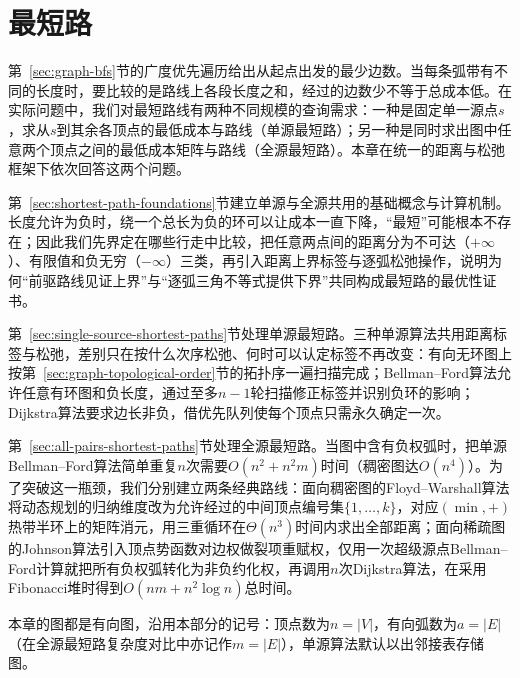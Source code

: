 
\chapter{最短路}
\label{sec:graph-shortest-paths}
\label{chap:shortest-paths}
\label{chap:all-pairs-shortest-paths}
\label{chap:graph-optimization}

第~\ref{sec:graph-bfs}节的广度优先遍历给出从起点出发的最少边数。当每条弧带有不同的长度时，要比较的是路线上各段长度之和，经过的边数少不等于总成本低。在实际问题中，我们对最短路线有两种不同规模的查询需求：一种是固定单一源点$s$，求从$s$到其余各顶点的最低成本与路线（单源最短路）；另一种是同时求出图中任意两个顶点之间的最低成本矩阵与路线（全源最短路）。本章在统一的距离与松弛框架下依次回答这两个问题。

第~\ref{sec:shortest-path-foundations}节建立单源与全源共用的基础概念与计算机制。长度允许为负时，绕一个总长为负的环可以让成本一直下降，“最短”可能根本不存在；因此我们先界定在哪些行走中比较，把任意两点间的距离分为不可达（$+\infty$）、有限值和负无穷（$-\infty$）三类，再引入距离上界标签与逐弧松弛操作，说明为何“前驱路线见证上界”与“逐弧三角不等式提供下界”共同构成最短路的最优性证书。

第~\ref{sec:single-source-shortest-paths}节处理单源最短路。三种单源算法共用距离标签与松弛，差别只在按什么次序松弛、何时可以认定标签不再改变：有向无环图上按第~\ref{sec:graph-topological-order}节的拓扑序一遍扫描完成；Bellman--Ford算法允许任意有环图和负长度，通过至多$n-1$轮扫描修正标签并识别负环的影响；Dijkstra算法要求边长非负，借优先队列使每个顶点只需永久确定一次。

第~\ref{sec:all-pairs-shortest-paths}节处理全源最短路。当图中含有负权弧时，把单源Bellman--Ford算法简单重复$n$次需要$O(n^2+n^2m)$时间（稠密图达$O(n^4)$）。为了突破这一瓶颈，我们分别建立两条经典路线：面向稠密图的Floyd--Warshall算法将动态规划的归纳维度改为允许经过的中间顶点编号集$\{1,\ldots,k\}$，对应$(\min,+)$热带半环上的矩阵消元，用三重循环在$\Theta(n^3)$时间内求出全部距离；面向稀疏图的Johnson算法引入顶点势函数对边权做裂项重赋权，仅用一次超级源点Bellman--Ford计算就把所有负权弧转化为非负约化权，再调用$n$次Dijkstra算法，在采用Fibonacci堆时得到$O(nm+n^2\log n)$总时间。

本章的图都是有向图，沿用本部分的记号：顶点数为$n=|V|$，有向弧数为$a=|E|$（在全源最短路复杂度对比中亦记作$m=|E|$），单源算法默认以出邻接表存储图。





